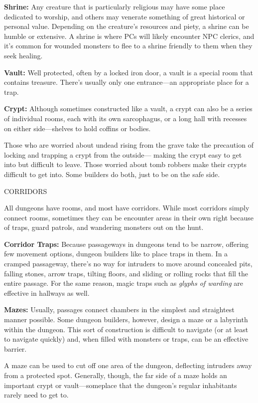 \documentclass{article}
\begin{document}
\textbf{Shrine:} Any creature that is particularly religious may have some place 
dedicated to worship, and others may venerate something of great historical or 
personal value. Depending on the creature's resources and piety, a shrine can be 
humble or extensive. A shrine is where PCs will likely encounter NPC clerics, and 
it's common for wounded monsters to flee to a shrine friendly to them when they 
seek healing.

\textbf{Vault:} Well protected, often by a locked iron door, a vault is a special 
room that contains treasure. There's usually only one entrance---an appropriate 
place for a trap.

\textbf{Crypt:} Although sometimes constructed like a vault, a crypt can also be 
a series of individual rooms, each with its own sarcophagus, or a long hall with 
recesses on either side---shelves to hold coffins or bodies.

Those who are worried about undead rising from the grave take the precaution of 
locking and trapping a crypt from the outside--- making the crypt easy to get into 
but difficult to leave. Those worried about tomb robbers make their crypts difficult 
to get into. Some builders do both, just to be on the safe side.

\vspace{12pt}
{\large{}CORRIDORS}

All dungeons have rooms, and most have corridors. While most corridors simply connect 
rooms, sometimes they can be encounter areas in their own right because of traps, 
guard patrols, and wandering monsters out on the hunt.

\textbf{Corridor Traps:} Because passageways in dungeons tend to be narrow, offering 
few movement options, dungeon builders like to place traps in them. In a cramped 
passageway, there's no way for intruders to move around concealed pits, falling 
stones, arrow traps, tilting floors, and sliding or rolling rocks that fill the 
entire passage. For the same reason, magic traps such as \textit{glyphs of warding 
}are effective in hallways as well.

\textbf{Mazes: }Usually, passages connect chambers in the simplest and straightest 
manner possible. Some dungeon builders, however, design a maze or a labyrinth within 
the dungeon. This sort of construction is difficult to navigate (or at least to 
navigate quickly) and, when filled with monsters or traps, can be an effective 
barrier.

A maze can be used to cut off one area of the dungeon, deflecting intruders away 
from a protected spot. Generally, though, the far side of a maze holds an important 
crypt or vault---someplace that the dungeon's regular inhabitants rarely need to 
get to.
\end{document}
